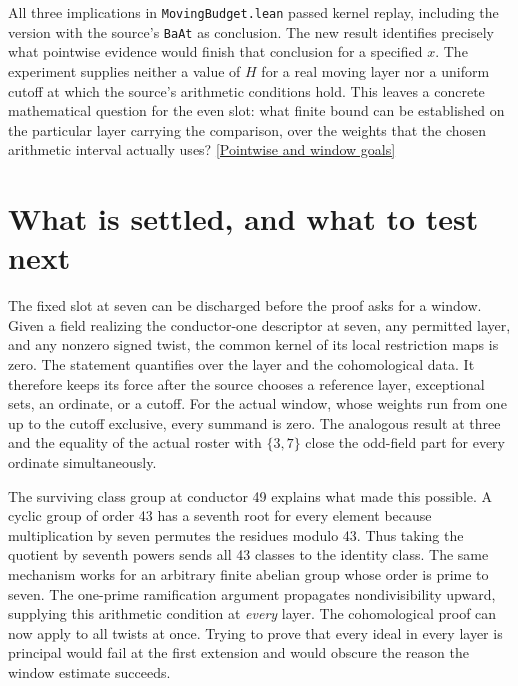 \documentclass[12pt,letterpaper]{article}
\begin{document}
All three implications in \texttt{MovingBudget.lean} passed kernel replay, including the version with the source's \texttt{BaAt} as conclusion. The new result identifies precisely what pointwise evidence would finish that conclusion for a specified \(x\). The experiment supplies neither a value of \(H\) for a real moving layer nor a uniform cutoff at which the source's arithmetic conditions hold. This leaves a concrete mathematical question for the even slot: what finite bound can be established on the particular layer carrying the comparison, over the weights that the chosen arithmetic interval actually uses?
\href{https://github.com/nousentllc/riemann-hypothesis/blob/40e56bab026552e089d7afcfeff08d2defb9c005/src/Development/AutomorphicArithmetic/AutomorphicVarieties/PrimeSetBoundDataOfPrimitiveChar.lean#L32-L41}{[Pointwise and window goals]}


\section{What is settled, and what to test next}

The fixed slot at seven can be discharged before the proof asks for a window. Given a field realizing the conductor-one descriptor at seven, any permitted layer, and any nonzero signed twist, the common kernel of its local restriction maps is zero. The statement quantifies over the layer and the cohomological data. It therefore keeps its force after the source chooses a reference layer, exceptional sets, an ordinate, or a cutoff. For the actual window, whose weights run from one up to the cutoff exclusive, every summand is zero. The analogous result at three and the equality of the actual roster with \(\{3,7\}\) close the odd-field part for every ordinate simultaneously.

The surviving class group at conductor 49 explains what made this possible. A cyclic group of order 43 has a seventh root for every element because multiplication by seven permutes the residues modulo 43. Thus taking the quotient by seventh powers sends all 43 classes to the identity class. The same mechanism works for an arbitrary finite abelian group whose order is prime to seven. The one-prime ramification argument propagates nondivisibility upward, supplying this arithmetic condition at \emph{every} layer. The cohomological proof can now apply to all twists at once. Trying to prove that every ideal in every layer is principal would fail at the first extension and would obscure the reason the window estimate succeeds.
\end{document}
